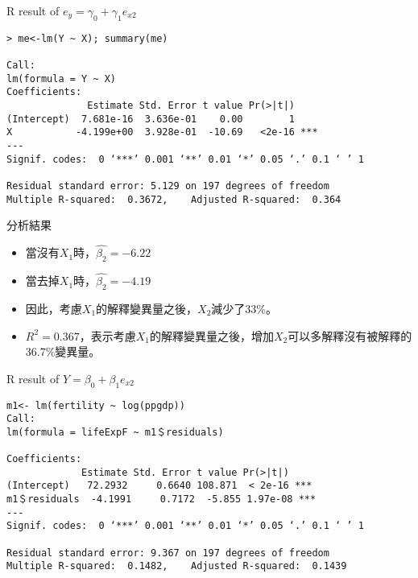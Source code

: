 \documentclass[xcolor=dvipsnames]{beamer}
\begin{document}
\begin{frame}[fragile=singleslide]{R result of $e_{y}=\gamma_{0}+\gamma_{1}e_{x2}$}
\begin{Verbatim}[frame=single,label=R code,
fontseries=b,xleftmargin=2mm,commandchars=\\\{\},
formatcom=\color{blue}]
> me<-lm(Y ~ X); summary(me)

Call:
lm(formula = Y ~ X)
Coefficients:
              Estimate Std. Error t value Pr(>|t|)    
(Intercept)  7.681e-16  3.636e-01    0.00        1    
X           -4.199e+00  3.928e-01  -10.69   <2e-16 ***
---
Signif. codes:  0 ‘***’ 0.001 ‘**’ 0.01 ‘*’ 0.05 ‘.’ 0.1 ‘ ’ 1

Residual standard error: 5.129 on 197 degrees of freedom
Multiple R-squared:  0.3672,	Adjusted R-squared:  0.364 
\end{Verbatim}
\end{frame}
\begin{frame}{分析結果}
\begin{itemize}

\item 當沒有$X_{1}$時，$\hat{\beta_{2}}=-6.22$
\item 當去掉$X_{1}$時，$\hat{\beta_{2}}=-4.19$
\item 因此，考慮$X_{1}$的解釋變異量之後，$X_{2}$減少了33\%。
\item $R^2=0.367$，表示考慮$X_{1}$的解釋變異量之後，增加$X_{2}$可以多解釋沒有被解釋的36.7\%變異量。
\end{itemize}
\end{frame}

\begin{frame}[fragile=singleslide]{R result of $Y=\beta_{0}+\beta_{1}e_{x2}$}
\begin{Verbatim}[frame=single,label=R code,
fontseries=b,xleftmargin=2mm,commandchars=\\\{\},
formatcom=\color{blue}]
m1<- lm(fertility ~ log(ppgdp))
Call:
lm(formula = lifeExpF ~ m1＄residuals)

Coefficients:
             Estimate Std. Error t value Pr(>|t|)    
(Intercept)   72.2932     0.6640 108.871  < 2e-16 ***
m1＄residuals  -4.1991     0.7172  -5.855 1.97e-08 ***
---
Signif. codes:  0 ‘***’ 0.001 ‘**’ 0.01 ‘*’ 0.05 ‘.’ 0.1 ‘ ’ 1

Residual standard error: 9.367 on 197 degrees of freedom
Multiple R-squared:  0.1482,	Adjusted R-squared:  0.1439 
\end{Verbatim}
\end{frame}
\end{document}
